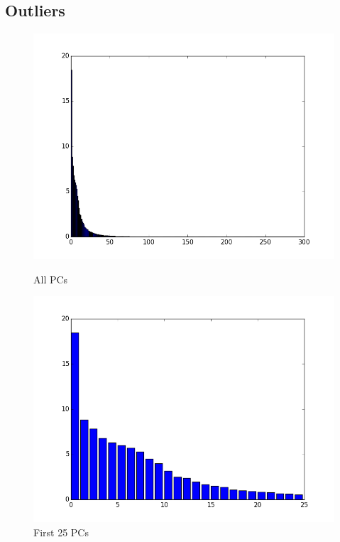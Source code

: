 \documentclass[a4paper,11pt]{article}
\begin{document}
\subsection*{Outliers}
\begin{figure}[H]

  \includegraphics[width=\linewidth]{5_b_a_23479.png}
  \caption{All PCs}
\endminipage\hfill
{}
  \includegraphics[width=\linewidth]{5_b_b_23479.png}
  \caption{First 25 PCs}
\endminipage\hfill
{}%

\end{figure}
\end{document}
